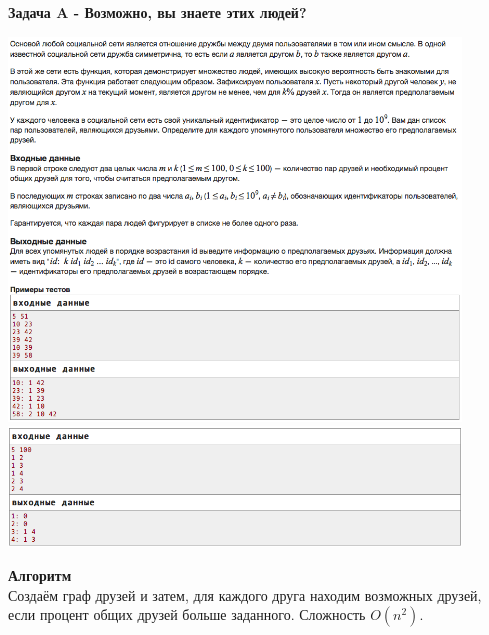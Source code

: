 \documentclass[a4paper,12pt]{article}
\begin{document}
\textbf{{\large Задача A - Возможно, вы знаете этих людей?}} \\
\begin{center}
\includegraphics[width=0.9\textwidth]{VK_R_1/VK_1_A1.png}\\
\includegraphics[width=0.9\textwidth]{VK_R_1/VK_1_A2.png}\\ [1cm]
\end{center}
\textbf{{\large Алгоритм}} \\
Создаём граф друзей и затем, для каждого друга находим возможных друзей, если процент общих друзей больше заданного. Сложность $O(n^2)$.\\
\end{document}
